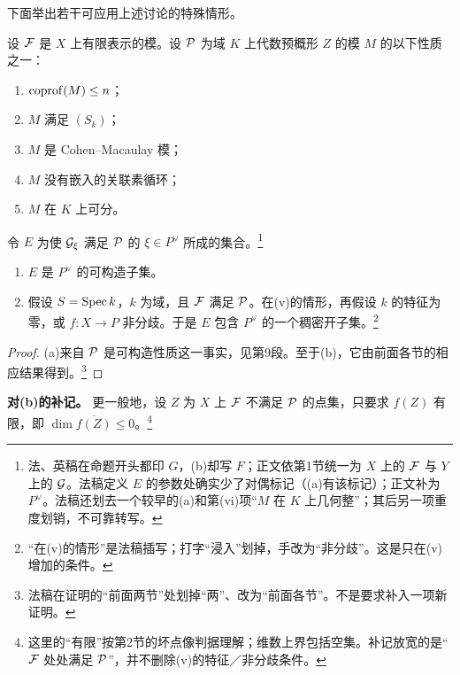 下面举出若干可应用上述讨论的特殊情形。

设 $\mathcal F$ 是 $X$ 上有限表示的模。设 $\mathcal P$ 为域 $K$ 上代数预概形 $Z$ 的模 $M$ 的以下性质之一：
\begin{enumerate}[label=(\roman*),nosep]
\item $\operatorname{coprof}(M)\leq n$；
\item $M$ 满足 $(S_k)$；
\item $M$ 是 Cohen--Macaulay 模；
\item $M$ 没有嵌入的关联素循环；
\item $M$ 在 $K$ 上可分。
\end{enumerate}
令 $E$ 为使 $\mathcal G_\xi$ 满足 $\mathcal P$ 的 $\xi\in P^\vee$ 所成的集合。\footnote{法、英稿在命题开头都印 $G$，(b)却写 $F$；正文依第1节统一为 $X$ 上的 $\mathcal F$ 与 $Y$ 上的 $\mathcal G$。法稿定义 $E$ 的参数处确实少了对偶标记（(a)有该标记）；正文补为 $P^\vee$。法稿还划去一个较早的(a)和第(vi)项“$M$ 在 $K$ 上几何整”；其后另一项重度划销，不可靠转写。}
\begin{enumerate}[label=(\alph*),nosep]
\item $E$ 是 $P^\vee$ 的可构造子集。
\item 假设 $S=\operatorname{Spec} k$，$k$ 为域，且 $\mathcal F$ 满足 $\mathcal P$。在(v)的情形，再假设 $k$ 的特征为零，或 $f:X\to P$ 非分歧。于是 $E$ 包含 $P^\vee$ 的一个稠密开子集。\footnote{“在(v)的情形”是法稿插写；打字“浸入”划掉，手改为“非分歧”。这是只在(v)增加的条件。}
\end{enumerate}
\begin{proof}
(a)来自 $\mathcal P$ 是可构造性质这一事实，见第9段。至于(b)，它由前面各节的相应结果得到。\footnote{法稿在证明的“前面两节”处划掉“两”、改为“前面各节”。不是要求补入一项新证明。}
\end{proof}
\noindent\textbf{对(b)的补记。}
更一般地，设 $Z$ 为 $X$ 上 $\mathcal F$ 不满足 $\mathcal P$ 的点集，只要求 $f(Z)$ 有限，即 $\dim\overline{f(Z)}\leq0$。\footnote{这里的“有限”按第2节的坏点像判据理解；维数上界包括空集。补记放宽的是“$\mathcal F$ 处处满足 $\mathcal P$”，并不删除(v)的特征／非分歧条件。}

